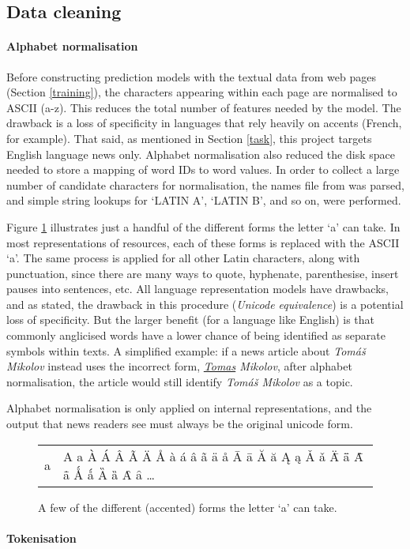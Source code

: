 \subsection{Data cleaning\label{clean}}
\paragraph{Alphabet normalisation}
Before constructing prediction models with
the textual data from web pages (Section \ref{training}), the
characters appearing within each page are normalised to
ASCII (a-z).  This reduces the total number of features needed
by the model. The drawback  is a loss of specificity in
languages that rely heavily on accents (French, for example).
That said, as mentioned in Section \ref{task}, this project targets
English language news only.
Alphabet normalisation also reduced the disk space needed to store a
mapping of word IDs to word values.  In order to collect a large
number of candidate characters for normalisation, the names file from
 was parsed, and simple string lookups for `LATIN A',
`LATIN B', and so on, were performed.

Figure \ref{alpha} illustrates just a handful of
the different forms the letter `a' can take.  In most representations
of resources, each of these forms is replaced with the
ASCII `a'.  The same process is applied for all other Latin characters,
along with punctuation, since there are many ways to quote, hyphenate,
parenthesise, insert pauses into sentences, etc.  All language
representation models have drawbacks, and as stated, the drawback in
this procedure ({\it Unicode equivalence}) is a potential loss
of specificity.  But the larger benefit (for a language like English)
is that commonly anglicised words have a lower chance of being
identified as separate symbols within texts.  A simplified example: if
a news article about {\it Tomáš Mikolov} instead uses the incorrect
form, {\it \underline{Tomas} Mikolov}, after alphabet normalisation,
the article would still identify {\it Tomáš Mikolov} as a topic.

Alphabet normalisation is only applied on internal representations,
and the output that news readers see must always be the original
unicode form.

\begin{figure}
    \centering
    \begin{tabular}{l|l}
        a & A a À Á Â Ã Ä Å à á â ã ä å Ā ā Ă ă Ą ą Ǎ ǎ Ǟ ǟ Ǡ ǡ Ǻ ǻ Ȁ ȁ Ȃ ȃ \ldots
    \end{tabular}
    \caption{A few of the different (accented) forms the letter `a' can take.}
    \label{alpha}
\end{figure}


\paragraph{Tokenisation}